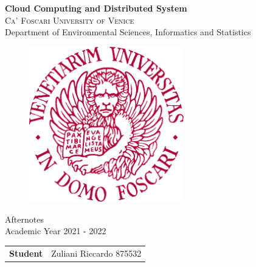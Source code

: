 \begin{titlepage}
    \vspace*{1 cm}
    \begin{center}
         {\LARGE \textbf{Cloud Computing and Distributed System}\\}
        \vspace{2 cm}
        \textsc{Ca' Foscari University of Venice}\\
        Department of Environmental Sciences, Informatics and Statistics\\
        \vspace{0.2 cm}
        \begin{figure}[h!]
        	\centering
        	\includegraphics[width=0.6\textwidth]{logo} 
        \end{figure}
        \vspace{0.0 cm} Afternotes\\
        Academic Year 2021 - 2022\\
        \vspace{3.0 cm}
        	
        \begin{flushleft}
        	\begin{tabular}{l l}
        		\textbf{Student} & Zuliani Riccardo 875532\\
        	\end{tabular}
        \end{flushleft}
    \end{center}
\end{titlepage}
